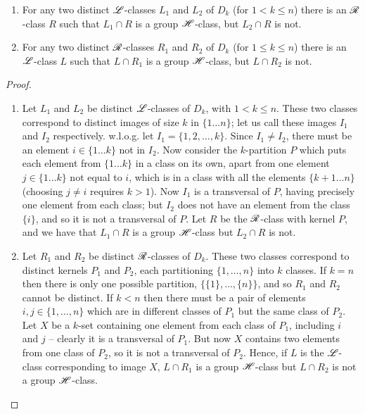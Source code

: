 \begin{lemma}
\label{lem:hclasses}
\leavevmode
  \begin{enumerate}[\rm(1)]
  \item For any two distinct $\mathrel{\mathscr{L}}$-classes $L_1$ and $L_2$ of $D_k$ (for
    $1 < k \leq n$) there is an $\mathrel{\mathscr{R}}$-class $R$ such that $L_1 \cap R$
    is a group $\mathrel{\mathscr{H}}$-class, but $L_2 \cap R$ is not.
  \item For any two distinct $\mathrel{\mathscr{R}}$-classes $R_1$ and $R_2$ of $D_k$ (for
    $1 \leq k \leq n$) there is an $\mathrel{\mathscr{L}}$-class $L$ such that $L \cap
    R_1$ is a group $\mathrel{\mathscr{H}}$-class, but $L \cap R_2$ is not.
  \end{enumerate}
  \begin{proof}
    \leavevmode
    \begin{enumerate}[\rm(1)]
    \item Let $L_1$ and $L_2$ be distinct $\mathrel{\mathscr{L}}$-classes of $D_k$, with
      $1 < k \leq n$.  These two classes correspond to distinct images of size
      $k$ in $\{1 \dots n\}$; let us call these images $I_1$ and $I_2$
      respectively.  w.l.o.g. let $I_1 = \{1, 2, \dots, k\}$.  Since $I_1 \neq
      I_2$, there must be an element $i \in \{1 \dots k\}$ not in $I_2$.  Now
      consider the $k$-partition $P$ which puts each element from $\{1 \dots
      k\}$ in a class on its own, apart from one element $j \in \{1 \dots k\}$
      not equal to $i$, which is in a class with all the elements $\{k+1 \dots
      n\}$ (choosing $j \neq i$ requires $k > 1$).  Now $I_1$ is a transversal
      of $P$, having precisely one element from each class; but $I_2$ does not
      have an element from the class $\{i\}$, and so it is not a transversal of
      $P$.  Let $R$ be the $\mathrel{\mathscr{R}}$-class with kernel $P$, and we have that
      $L_1 \cap R$ is a group $\mathrel{\mathscr{H}}$-class but $L_2 \cap R$ is not.

    \item Let $R_1$ and $R_2$ be distinct $\mathrel{\mathscr{R}}$-classes of $D_k$.  These two classes
      correspond to distinct kernels $P_1$ and $P_2$, each partitioning $\{1,
      \dots, n\}$ into $k$ classes.  If $k=n$ then there is only one possible
      partition, $\big\{\{1\}, \dots, \{n\}\big\}$, and so $R_1$ and $R_2$
      cannot be distinct.  If $k<n$ then there must be a pair of elements $i,j \in
      \{1,\dots, n\}$ which are in different classes of $P_1$ but the same class
      of $P_2$.  Let $X$ be a $k$-set containing one element from each class of
      $P_1$, including $i$ and $j$ -- clearly it is a transversal of $P_1$.  But
      now $X$ contains two elements from one class of $P_2$, so it is not a
      transversal of $P_2$.  Hence, if $L$ is the $\mathrel{\mathscr{L}}$-class corresponding to image
      $X$, $L \cap R_1$ is a group $\mathrel{\mathscr{H}}$-class but $L \cap R_2$ is not a group
      $\mathrel{\mathscr{H}}$-class.
    \end{enumerate}
  \end{proof}
\end{lemma}

